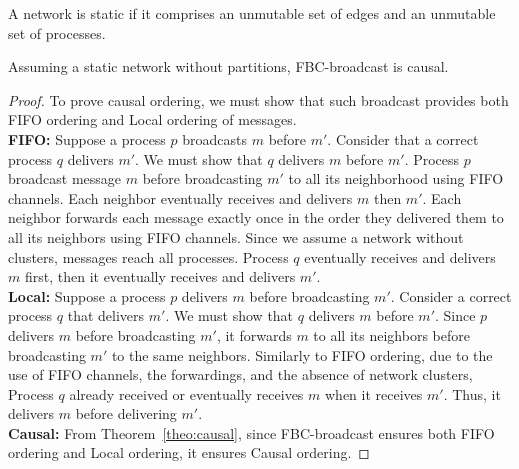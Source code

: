 \begin{definition}
  A network is static if it comprises an unmutable set of edges and an unmutable
  set of processes.
\end{definition}


\begin{theorem}
  Assuming a static network without partitions, FBC-broadcast is causal.
\end{theorem}

\begin{proof}  To
  prove causal ordering, we must show that such broadcast provides both FIFO
  ordering and Local ordering of messages. \\
  \textbf{FIFO:} Suppose a process $p$ broadcasts $m$ before $m'$. Consider that
  a correct process $q$ delivers $m'$. We must show that $q$ delivers $m$ before
  $m'$. Process $p$ broadcast message $m$ before broadcasting $m'$ to all its
  neighborhood using FIFO channels. Each neighbor eventually receives and
  delivers $m$ then $m'$. Each neighbor forwards each message exactly once in
  the order they delivered them to all its neighbors using FIFO channels. Since
  we assume a network without clusters, messages reach all processes. Process
  $q$ eventually receives and delivers $m$ first, then it eventually receives
  and delivers $m'$. \\
  \textbf{Local:} Suppose a process $p$ delivers $m$ before broadcasting
  $m'$. Consider a correct process $q$ that delivers $m'$. We must show that $q$
  delivers $m$ before $m'$. Since $p$ delivers $m$ before broadcasting $m'$, it
  forwards $m$ to all its neighbors before broadcasting $m'$ to the same
  neighbors. Similarly to FIFO ordering, due to the use of FIFO channels, the
  forwardings, and the absence of network clusters, Process $q$ already received
  or eventually receives $m$ when it receives $m'$. Thus, it delivers $m$ before
  delivering $m'$. \\
  \textbf{Causal:} From Theorem~\ref{theo:causal}, since FBC-broadcast ensures
  both FIFO ordering and Local ordering, it ensures Causal ordering.
\end{proof}


